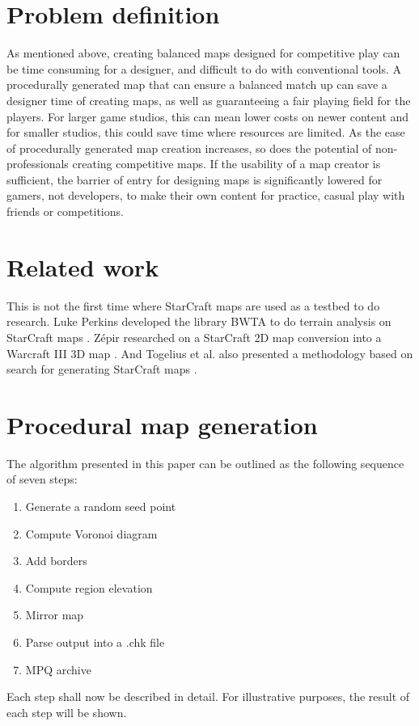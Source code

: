 \documentclass[letterpaper]{article}
\begin{document}
\section{Problem definition} %
\label{sec:problem_definition}
As mentioned above, creating balanced maps designed for competitive play can be time consuming for a designer, and difficult to do with conventional tools. A procedurally generated map that can ensure a balanced match up can save a designer time of creating maps, as well as guaranteeing a fair playing field for the players. For larger game studios, this can mean lower costs on newer content and for smaller studios, this could save time where resources are limited.
As the ease of procedurally generated map creation increases, so does the potential of non-professionals creating competitive maps. If the usability of a map creator is sufficient, the barrier of entry for designing maps is significantly lowered for gamers, not developers, to make their own content for practice, casual play with friends or competitions.



\section{Related work} %
\label{sec:related_work}
This is not the first time where StarCraft maps are used as a testbed to do research. Luke Perkins developed the library BWTA to do terrain analysis on StarCraft maps \cite{Perkins10}. Z\'{e}pir researched on a StarCraft 2D map conversion into a Warcraft III 3D map \cite{Zepir}. And Togelius et al. also presented a methodology based on search for generating StarCraft maps \cite{Togelius10}.


\section{Procedural map generation} %
\label{sec:procedural_map_generation}
The algorithm presented in this paper can be outlined as the following sequence of seven steps:
\begin{enumerate}
	\item Generate a random seed point
	\item Compute Voronoi diagram
	\item Add borders
	\item Compute region elevation
	\item Mirror map
	\item Parse output into a .chk file
	\item MPQ archive
\end{enumerate}
Each step shall now be described in detail. For illustrative purposes, the result of each step will be shown.
\end{document}
